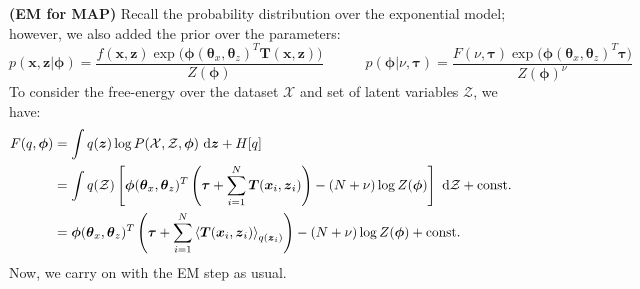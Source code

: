 \begin{remark}{\textbf{(EM for MAP)}}
    Recall the probability distribution over the exponential model; however, we also added the prior over the parameters:
    \begin{equation*}
        p(\boldsymbol x, \boldsymbol z | \boldsymbol \phi) = \frac{f(\boldsymbol x, \boldsymbol z) \exp\Big( \boldsymbol \phi(\boldsymbol \theta_x, \boldsymbol \theta_z) ^T\boldsymbol T(\boldsymbol x, \boldsymbol z)\Big) }{Z(\boldsymbol \phi)} \qquad\quad p(\boldsymbol \phi | \nu, \boldsymbol \tau) = \frac{F(\nu, \boldsymbol \tau)\exp\Big( \boldsymbol \phi(\boldsymbol \theta_x, \boldsymbol \theta_z)^T\boldsymbol\tau \Big)}{Z(\boldsymbol\phi)^\nu}
    \end{equation*}
    To consider the free-energy over the dataset $\mathcal{X}$ and set of latent variables $\mathcal{Z}$, we have:
    \begin{equation*}
    \begin{aligned}
        F(q, \boldsymbol \phi) &= \int q(\boldsymbol z) \log P(\mathcal{X}, \mathcal{Z}, \boldsymbol \phi) \ \mathrm{d} \boldsymbol z + H[q] \\
        &= \int q(\mathcal{Z}) \left[  \boldsymbol \phi(\boldsymbol \theta_x, \boldsymbol \theta_z) ^T\left( \boldsymbol\tau + \sum^N_{i=1}\boldsymbol T(\boldsymbol x_i, \boldsymbol z_i) \right) - (N+\nu)\log Z(\boldsymbol \phi)  \right]\ \mathrm{d} \mathcal{Z} + \text{const.} \\
        &=  \boldsymbol \phi(\boldsymbol \theta_x, \boldsymbol \theta_z) ^T\left( \boldsymbol\tau + \sum^N_{i=1}\left\langle \boldsymbol T(\boldsymbol x_i, \boldsymbol z_i) \right\rangle_{q(\boldsymbol z_i)} \right) - (N+\nu)\log Z(\boldsymbol \phi) + \text{const.}
    \end{aligned}
    \end{equation*}
    Now, we carry on with the EM step as usual. 
\end{remark}
